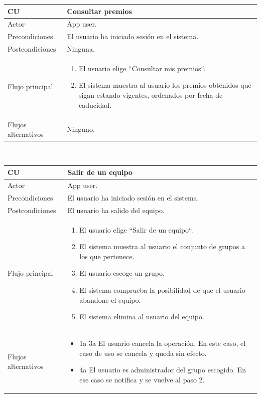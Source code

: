 \documentclass[twoside]{report}
\newcommand\addrow[2]{#1 &#2\\ }
\newcommand\addheading[2]{#1 &#2\\ \hline}
\newcommand\tabularhead{\begin{tabular}{lp{0.7\textwidth}}
\hline
}
\newenvironment{usecase}{\tabularhead}
{\hline\end{tabular}}
\begin{document}
\vspace{0.5cm}

\begin{usecase}
  \addheading{\textbf{CU\arabic{usecase}}}{Consultar premios} 
  \addrow{Actor}{App user.}
  \addrow{Precondiciones}{El usuario ha iniciado sesión en el sistema.}
  \addrow{Postcondiciones}{Ninguna.}
  \addrow{Flujo principal}{
  		\begin{enumerate}
  		\item El usuario elige “Consultar mis premios“.
  		\item El sistema muestra al usuario los premios obtenidos que sigan estando vigentes, ordenados por fecha de caducidad.
  		\end{enumerate}
  }
  \addrow{Flujos alternativos}{Ninguno.}
\end{usecase}\\

\vspace{0.5cm}

\begin{usecase}
  \addheading{\textbf{CU\arabic{usecase}}}{Salir de un equipo} 
  \addrow{Actor}{App user.}
  \addrow{Precondiciones}{El usuario ha iniciado sesión en el sistema.}
  \addrow{Postcondiciones}{El usuario ha salido del equipo.}
  \addrow{Flujo principal}{
  		\begin{enumerate}
  		\item El usuario elige “Salir de un equipo“. %
  		\item El sistema muestra al usuario el conjunto de grupos a los que pertenece. %
  		\item El usuario escoge un grupo. %
  		\item El sistema comprueba la posibilidad de que el usuario abandone el equipo. %
  		\item El sistema elimina al usuario del equipo.
  		\end{enumerate}
  }
  \addrow{Flujos alternativos}{
  		\begin{itemize}
  		\item 1a 3a El usuario cancela la operación. En este caso, el caso de uso se cancela y queda sin efecto.
  		\item 4a El usuario es administrador del grupo escogido. En ese caso se notifica y se vuelve al paso 2.
  		\end{itemize}
  }
\end{usecase}\\
\end{document}
